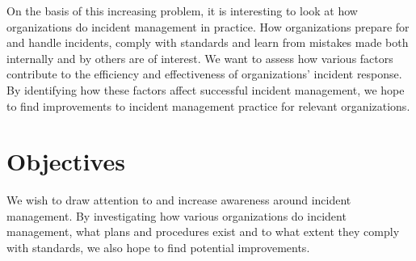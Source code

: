 On the basis of this increasing problem, it is interesting to look at how organizations do incident management in practice. How organizations prepare for and handle incidents, comply with standards and learn from mistakes made both internally and by others are of interest. We want to assess how various factors contribute to the efficiency and effectiveness of organizations’ incident response. By identifying how these factors affect successful incident management, we hope to find improvements to incident management practice for relevant organizations. 




\section{Objectives}
\label{sec:objectives}
We wish to draw attention to and increase awareness around incident management. By investigating how various organizations do incident management, what plans and procedures exist and to what extent they comply with standards, we also hope to find potential improvements.

